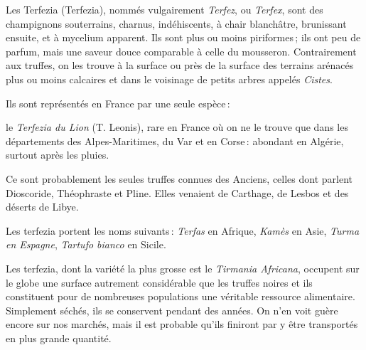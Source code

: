 Les Terfezia (Terfezia), nommés vulgairement \textit{Terfez}, ou
\textit{Terfex}, sont des champignons souterrains, charnus, indéhiscents,
à chair blanchâtre, brunissant ensuite, et à mycelium apparent. Ils sont plus
ou moins piriformes ; ils ont peu de parfum, mais une saveur douce comparable
à celle du mousseron. Contrairement aux truffes, on les trouve à la surface ou
près de la surface des terrains arénacés plus ou moins calcaires et dans le
voisinage de petits arbres appelés \textit{Cistes}.

Ils sont représentés en France par une seule espèce :

le \textit{Terfezia du Lion} (T. Leonis), rare en France où on ne le trouve que
dans les départements des Alpes-Maritimes, du Var et en Corse : abondant en
Algérie, surtout après les pluies.

Ce sont probablement les seules truffes connues des Anciens, celles dont
parlent Dioscoride, Théophraste et Pline. Elles venaient de Carthage, de Lesbos
et des déserts de Libye.

Les terfezia portent les noms suivants : \textit{Terfas} en Afrique,
\textit{Kamès} en Asie, \textit{Turma en Espagne}, \textit{Tartufo bianco} en
Sicile.

Les terfezia, dont la variété la plus grosse est le \textit{Tirmania Africana},
occupent sur le globe une surface autrement considérable que les truffes noires
et ils constituent pour de nombreuses populations une véritable ressource
alimentaire. Simplement séchés, ils se conservent pendant des années. On n'en
voit guère encore sur nos marchés, mais il est probable qu'ils finiront par
y être transportés en plus grande quantité.
